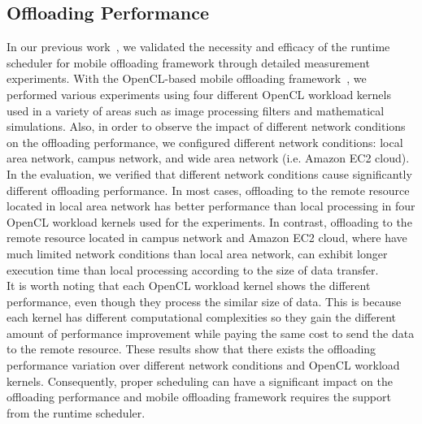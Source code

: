 \documentclass[10pt, conference, compsocconf]{IEEEtran}
\begin{document}
\subsection{Offloading Performance}
%
In our previous work~\cite{ml}, we validated the necessity and efficacy
of the runtime scheduler for mobile offloading framework through
detailed measurement experiments.
%
With the OpenCL-based mobile offloading framework~\cite{ocloff}, we
performed various experiments using four different OpenCL workload
kernels used in a variety of areas such as image processing filters and
mathematical simulations.
%
Also, in order to observe the impact of different network conditions on
the offloading performance, we configured different network conditions:
local area network, campus network, and wide area network (i.e. Amazon
EC2 cloud).
%
In the evaluation, we verified that different network conditions cause
significantly different offloading performance.
%
In most cases, offloading to the remote resource located in local area
network has better performance than local processing in four OpenCL
workload kernels used for the experiments.
%
In contrast, offloading to the remote resource located in campus network
and Amazon EC2 cloud, where have much limited network conditions than
local area network, can exhibit longer execution time than local
processing according to the size of data transfer.\\ 
%
\indent It is worth noting that each OpenCL workload kernel shows
the different performance, even though they process the similar size of
data.
%
This is because each kernel has different computational complexities so
they gain the different amount of performance improvement while paying
the same cost to send the data to the remote resource.
%
These results show that there exists the offloading performance
variation over different network conditions and OpenCL workload kernels.
%
Consequently, proper scheduling can have a significant impact on the
offloading performance and mobile offloading framework requires the
support from the runtime scheduler.
%
\end{document}
